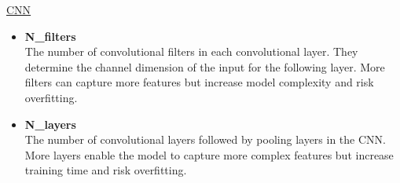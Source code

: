 \documentclass[a4paper,12pt]{report}
\begin{document}
\begin{minipage}{\textwidth}
\underline{CNN}
\begin{itemize}
  \item \textbf{N\_filters} \\
  The number of convolutional filters in each convolutional layer. They determine the channel dimension of the input for the following layer. More filters can capture more features but increase model complexity and risk overfitting.

  \item \textbf{N\_layers} \\
  The number of convolutional layers followed by pooling layers in the CNN. More layers enable the model to capture more complex features but increase training time and risk overfitting.

\end{itemize}
\end{minipage}
\end{document}
